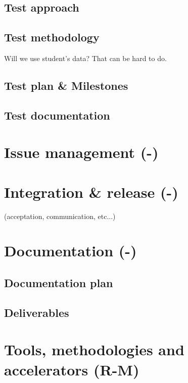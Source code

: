 \documentclass[a4paper,12pt,abstracton,titlepage]{scrartcl}
\begin{document}
\subsection{Test approach}
\lipsum[1]
\subsection{Test methodology}
Will we use student's data? That can be hard to do.

\subsection{Test plan \& Milestones}
\lipsum[1]
\subsection{Test documentation}
\lipsum[1]

\section{Issue management (-)}
\label{sec:issue-management}

\section{Integration \& release (-)}
\label{sec:integration-release}
(acceptation, communication, etc...)

\section{Documentation (-)}
\label{sec:documentation}
\subsection{Documentation plan}
\lipsum[1]
\subsection{Deliverables}
\lipsum[1]

\section{Tools, methodologies and accelerators (R-M)}
\label{sec:tools-methodologies}
\end{document}
